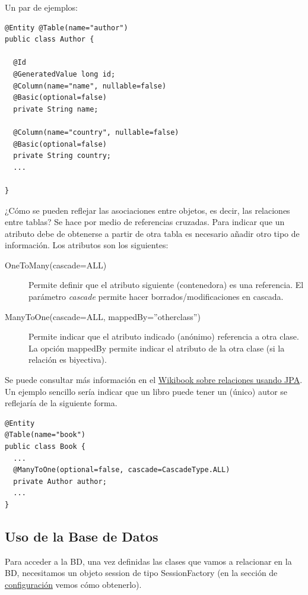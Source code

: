 \documentclass[11pt]{article}
\begin{document}
Un par de ejemplos:

\begin{lstlisting}
@Entity @Table(name="author")
public class Author {

  @Id
  @GeneratedValue long id;
  @Column(name="name", nullable=false)
  @Basic(optional=false)
  private String name;

  @Column(name="country", nullable=false)
  @Basic(optional=false)
  private String country;
  ...

}
\end{lstlisting}


¿Cómo se pueden reflejar las asociaciones entre objetos, es decir, las relaciones entre tablas? Se hace por medio de referencias cruzadas. Para indicar que un atributo debe de obtenerse a partir de
otra tabla es necesario añadir otro tipo de información. Los atributos son los siguientes:


\begin{description}

\item[OneToMany(cascade=ALL)] Permite definir que el atributo siguiente (contenedora) es una referencia. El parámetro \emph{cascade} permite hacer borrados/modificaciones en cascada.

\item[ManyToOne(cascade=ALL, mappedBy=''otherclass'')] Permite indicar que el atributo indicado (anónimo)
referencia a otra clase. La opción mappedBy permite indicar el atributo de la otra clase (si la relación es biyectiva).

\end{description}


Se puede consultar más información en el
\href{https://en.wikibooks.org/wiki/Java_Persistence/Relationships}{Wikibook
sobre relaciones usando JPA}. Un ejemplo sencillo sería indicar que un libro
puede tener un (único) autor se reflejaría de la siguiente forma.

\begin{lstlisting}
@Entity
@Table(name="book")
public class Book {
  ...
  @ManyToOne(optional=false, cascade=CascadeType.ALL)
  private Author author;
  ...
}
\end{lstlisting}


\subsection{Uso de la Base de Datos} \label{sec-6-3}

Para acceder a la BD, una vez definidas las clases que vamos a
relacionar en la BD, necesitamos un objeto \textsf{session} de tipo
\textsf{SessionFactory} (en la sección de \hyperref[sec-6-4]{configuración} vemos cómo obtenerlo).
\end{document}
